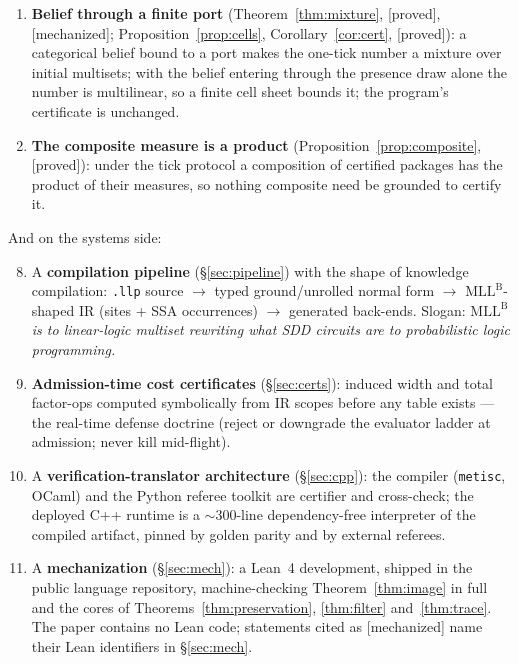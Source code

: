 \documentclass[11pt]{article}
\newcommand{\metisc}{\texttt{metisc}}
\newcommand{\mllb}{\mathrm{MLL}^{\mathrm B}}
\newcommand{\stproved}{[\textsf{proved}]}
\newcommand{\stmech}{[\textsf{mechanized}]}
\theoremstyle{plain}
\theoremstyle{definition}
\theoremstyle{remark}
\begin{document}
\begin{enumerate}[leftmargin=2em]
  compositional half remains Conjecture~\ref{conj:typing}.
\item \textbf{Belief through a finite port} (Theorem~\ref{thm:mixture},
  \stproved{}, \stmech{}; Proposition~\ref{prop:cells},
  Corollary~\ref{cor:cert}, \stproved{}):
  a categorical belief bound to a port makes the one-tick number a
  mixture over initial multisets; with the belief entering through the
  presence draw alone the number is multilinear, so a finite cell sheet
  bounds it; the program's certificate is unchanged.
\item \textbf{The composite measure is a product}
  (Proposition~\ref{prop:composite}, \stproved{}): under the tick
  protocol a composition of certified packages has the product of their
  measures, so nothing composite need be grounded to certify it.
\end{enumerate}

And on the systems side:
\begin{enumerate}[leftmargin=2em]\setcounter{enumi}{7}
\item A \textbf{compilation pipeline} (\S\ref{sec:pipeline}) with the
  shape of knowledge compilation: \texttt{.llp} source $\to$ typed
  ground/unrolled normal form $\to$ $\mllb$-shaped IR (sites + SSA
  occurrences) $\to$ generated back-ends. Slogan: \emph{$\mllb$ is to
  linear-logic multiset rewriting what SDD circuits are to probabilistic
  logic programming.}
\item \textbf{Admission-time cost certificates} (\S\ref{sec:certs}):
  induced width and total factor-ops computed symbolically from IR
  scopes before any table exists --- the real-time defense doctrine
  (reject or downgrade the evaluator ladder at admission; never kill
  mid-flight).
\item A \textbf{verification-translator architecture}
  (\S\ref{sec:cpp}): the compiler (\metisc, OCaml) and the Python
  referee toolkit are certifier and cross-check; the deployed C++
  runtime is a $\sim$300-line dependency-free interpreter of the
  compiled artifact, pinned by golden parity and by external referees.
\item A \textbf{mechanization} (\S\ref{sec:mech}): a Lean~4 development,
  shipped in the public language repository, machine-checking
  Theorem~\ref{thm:image} in full and the cores of
  Theorems~\ref{thm:preservation}, \ref{thm:filter}
  and~\ref{thm:trace}. The paper contains no Lean code; statements
  cited as \stmech{} name their Lean identifiers in \S\ref{sec:mech}.
\end{enumerate}
\end{document}
